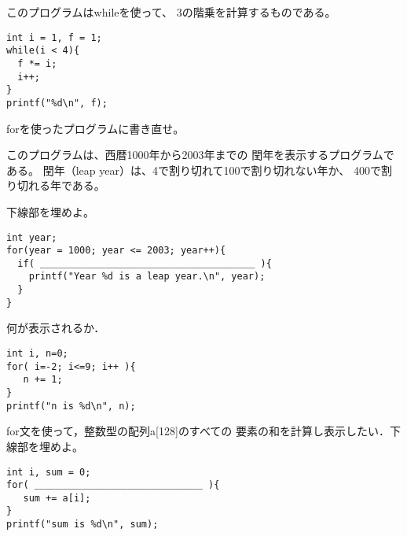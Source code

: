 \documentclass[12pt,a4j]{jarticle}
\newcounter{toi}
\def\toi{%
\bigskip\bigskip\noindent
\addtocounter{toi}{1}
\shadowbox{\bfseries\large 問\thetoi}
\nopagebreak[4]\bigskip\nopagebreak[4]
}
\begin{document}


\toi

このプログラムは{\ttfamily while}を使って、
3の階乗を計算するものである。
\begin{verbatim}
int i = 1, f = 1;
while(i < 4){
  f *= i;
  i++;
}
printf("%d\n", f);
\end{verbatim}
{\ttfamily for}を使ったプログラムに書き直せ。


\vspace*{3cm}






\toi


このプログラムは、西暦1000年から2003年までの
閏年を表示するプログラムである。
閏年（leap year）は、4で割り切れて100で割り切れない年か、
400で割り切れる年である。

下線部を埋めよ。
\begin{verbatim}
int year;
for(year = 1000; year <= 2003; year++){
  if( ＿＿＿＿＿＿＿＿＿＿＿＿＿＿＿＿＿＿＿＿＿＿＿ ){
    printf("Year %d is a leap year.\n", year);
  }
}
\end{verbatim}




\toi

何が表示されるか．
\begin{verbatim}
int i, n=0;
for( i=-2; i<=9; i++ ){
   n += 1;
}
printf("n is %d\n", n);
\end{verbatim}






\toi

for文を使って，整数型の配列a[128]のすべての
要素の和を計算し表示したい．下線部を埋めよ。
\begin{verbatim}
int i, sum = 0;
for( ＿＿＿＿＿＿＿＿＿＿＿＿＿＿＿＿＿＿ ){
   sum += a[i];
}
printf("sum is %d\n", sum);
\end{verbatim}
\end{document}
